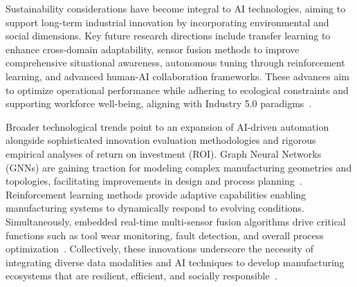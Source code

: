 \documentclass[sigconf]{acmart}
\begin{document}
Sustainability considerations have become integral to AI technologies, aiming to support long-term industrial innovation by incorporating environmental and social dimensions. Key future research directions include transfer learning to enhance cross-domain adaptability, sensor fusion methods to improve comprehensive situational awareness, autonomous tuning through reinforcement learning, and advanced human-AI collaboration frameworks. These advances aim to optimize operational performance while adhering to ecological constraints and supporting workforce well-being, aligning with Industry 5.0 paradigms~\cite{ref5,ref6,ref7,ref44}.

Broader technological trends point to an expansion of AI-driven automation alongside sophisticated innovation evaluation methodologies and rigorous empirical analyses of return on investment (ROI). Graph Neural Networks (GNNs) are gaining traction for modeling complex manufacturing geometries and topologies, facilitating improvements in design and process planning~\cite{ref31}. Reinforcement learning methods provide adaptive capabilities enabling manufacturing systems to dynamically respond to evolving conditions. Simultaneously, embedded real-time multi-sensor fusion algorithms drive critical functions such as tool wear monitoring, fault detection, and overall process optimization~\cite{ref34,ref39}. Collectively, these innovations underscore the necessity of integrating diverse data modalities and AI techniques to develop manufacturing ecosystems that are resilient, efficient, and socially responsible~\cite{ref9,ref33}.
\end{document}
